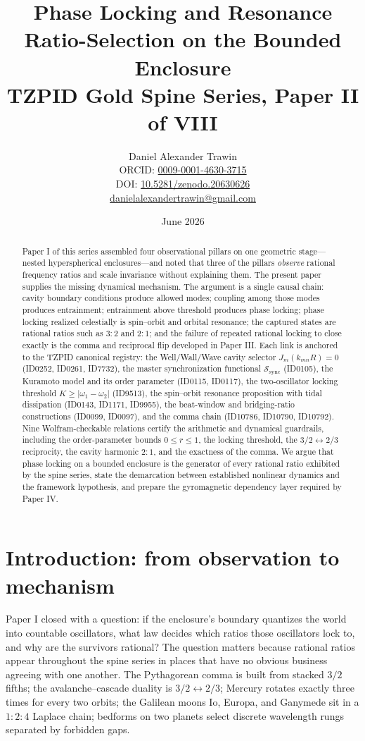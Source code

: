 \documentclass[11pt]{article}
\title{Phase Locking and Resonance Ratio-Selection on the Bounded Enclosure\\[0.6em]
\large TZPID Gold Spine Series, Paper II of VIII}
\author{Daniel Alexander Trawin\\
\small ORCID: \href{https://orcid.org/0009-0001-4630-3715}{0009-0001-4630-3715}\\
\small DOI: \href{https://doi.org/10.5281/zenodo.20630626}{10.5281/zenodo.20630626}\\
\small \href{mailto:danielalexandertrawin@gmail.com}{danielalexandertrawin@gmail.com}}
\date{June 2026}
\theoremstyle{remark}
\begin{document}
\maketitle

\begin{abstract}
Paper I of this series assembled four observational pillars on one geometric stage---nested hyperspherical enclosures---and noted that three of the pillars \emph{observe} rational frequency ratios and scale invariance without explaining them. The present paper supplies the missing dynamical mechanism. The argument is a single causal chain: cavity boundary conditions produce allowed modes; coupling among those modes produces entrainment; entrainment above threshold produces phase locking; phase locking realized celestially is spin--orbit and orbital resonance; the captured states are rational ratios such as $3{:}2$ and $2{:}1$; and the failure of repeated rational locking to close exactly is the comma and reciprocal flip developed in Paper III. Each link is anchored to the TZPID canonical registry: the Well/Wall/Wave cavity selector $J_m(k_{mn}R) = 0$ (ID0252, ID0261, ID7732), the master synchronization functional $\mathcal{S}_{\mathrm{sync}}$ (ID0105), the Kuramoto model and its order parameter (ID0115, ID0117), the two-oscillator locking threshold $K \geq |\omega_1 - \omega_2|$ (ID9513), the spin--orbit resonance proposition with tidal dissipation (ID0143, ID1171, ID9955), the beat-window and bridging-ratio constructions (ID0099, ID0097), and the comma chain (ID10786, ID10790, ID10792). Nine Wolfram-checkable relations certify the arithmetic and dynamical guardrails, including the order-parameter bounds $0 \leq r \leq 1$, the locking threshold, the $3/2 \leftrightarrow 2/3$ reciprocity, the cavity harmonic $2{:}1$, and the exactness of the comma. We argue that phase locking on a bounded enclosure is the generator of every rational ratio exhibited by the spine series, state the demarcation between established nonlinear dynamics and the framework hypothesis, and prepare the gyromagnetic dependency layer required by Paper IV.
\end{abstract}

\section{Introduction: from observation to mechanism}
\label{sec:intro}

Paper I closed with a question: if the enclosure's boundary quantizes the world into countable oscillators, what law decides which ratios those oscillators lock to, and why are the survivors rational? The question matters because rational ratios appear throughout the spine series in places that have no obvious business agreeing with one another. The Pythagorean comma is built from stacked $3/2$ fifths; the avalanche--cascade duality is $3/2 \leftrightarrow 2/3$; Mercury rotates exactly three times for every two orbits; the Galilean moons Io, Europa, and Ganymede sit in a $1{:}2{:}4$ Laplace chain; bedforms on two planets select discrete wavelength rungs separated by forbidden gaps.
\end{document}
